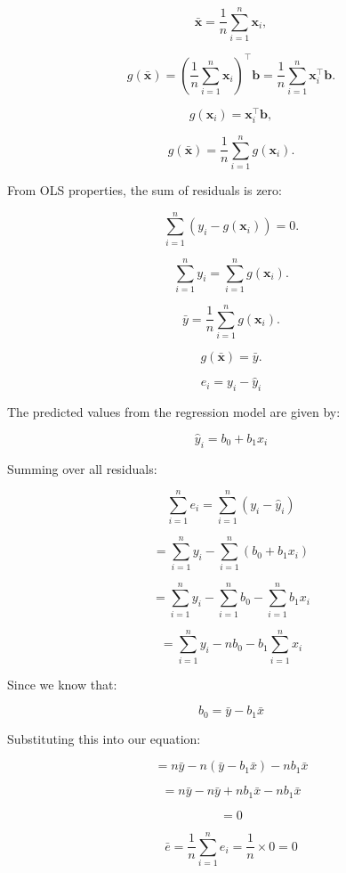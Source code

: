 \documentclass[12pt]{article}
\begin{document}
\begin{enumerate}
\[
\bar{\mathbf{x}} = \frac{1}{n} \sum_{i=1}^{n} \mathbf{x}_i,
\]


\[
g(\bar{\mathbf{x}}) = \left( \frac{1}{n} \sum_{i=1}^{n} \mathbf{x}_i \right)^\top \mathbf{b} = \frac{1}{n} \sum_{i=1}^{n} \mathbf{x}_i^\top \mathbf{b}.
\]


\[
g(\mathbf{x}_i) = \mathbf{x}_i^\top \mathbf{b},
\]


\[
g(\bar{\mathbf{x}}) = \frac{1}{n} \sum_{i=1}^{n} g(\mathbf{x}_i).
\]


From OLS properties, the sum of residuals is zero:

\[
\sum_{i=1}^{n} (y_i - g(\mathbf{x}_i)) = 0.
\]

\[
\sum_{i=1}^{n} y_i = \sum_{i=1}^{n} g(\mathbf{x}_i).
\]



\[
\bar{y} = \frac{1}{n} \sum_{i=1}^{n} g(\mathbf{x}_i).
\]


\[
g(\bar{\mathbf{x}}) = \bar{y}.
\]





\[
e_i = y_i - \hat{y}_i
\]

The predicted values from the regression model are given by:

\[
\hat{y}_i = b_0 + b_1 x_i
\]

Summing over all residuals:

\[
\sum_{i=1}^{n} e_i = \sum_{i=1}^{n} (y_i - \hat{y}_i)
\]

\[
= \sum_{i=1}^{n} y_i - \sum_{i=1}^{n} (b_0 + b_1 x_i)
\]

\[
= \sum_{i=1}^{n} y_i - \sum_{i=1}^{n} b_0 - \sum_{i=1}^{n} b_1 x_i
\]

\[
= \sum_{i=1}^{n} y_i - n b_0 - b_1 \sum_{i=1}^{n} x_i
\]

Since we know that:

\[
b_0 = \bar{y} - b_1 \bar{x}
\]

Substituting this into our equation:

\[
= n \bar{y} - n (\bar{y} - b_1 \bar{x}) - n b_1 \bar{x}
\]

\[
= n \bar{y} - n \bar{y} + n b_1 \bar{x} - n b_1 \bar{x}
\]

\[
= 0
\]



\[
\bar{e} = \frac{1}{n} \sum_{i=1}^{n} e_i = \frac{1}{n} \times 0 = 0
\]



\end{enumerate}
\end{document}
